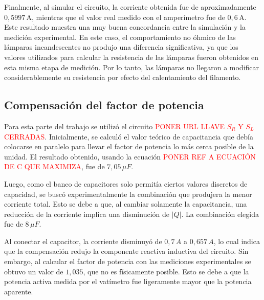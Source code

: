 Finalmente, al simular el circuito, la corriente obtenida fue de aproximadamente \(0{,}5997\,\mathrm{A}\), mientras que el valor real medido con el amperímetro fue de \(0{,}6\,\mathrm{A}\). Este resultado muestra una muy buena concordancia entre la simulación y la medición experimental. En este caso, el comportamiento no óhmico de las lámparas incandescentes no produjo una diferencia significativa, ya que los valores utilizados para calcular la resistencia de las lámparas fueron obtenidos en esta misma etapa de medición. Por lo tanto, las lámparas no llegaron a modificar considerablemente su resistencia por efecto del calentamiento del filamento.






\subsection{Compensación del factor de potencia}

Para esta parte del trabajo se utilizó el circuito \textcolor{red}{\MakeUppercase{Poner URL llave $S_R$ y $S_L$ cerradas}}. Inicialmente, se calculó el valor teórico de capacitancia que debía colocarse en paralelo para llevar el factor de potencia lo más cerca posible de la unidad. El resultado obtenido, usando la ecuación \textcolor{red}{\MakeUppercase{Poner ref a ecuación de C que maximiza}}, fue de \(7{,}05\,\mu F\).

Luego, como el banco de capacitores solo permitía ciertos valores discretos de capacidad, se buscó experimentalmente la combinación que produjera la menor corriente total. Esto se debe a que, al cambiar solamente la capacitancia, una reducción de la corriente implica una disminución de \( |Q| \). La combinación elegida fue de \(8\,\mu F\).

Al conectar el capacitor, la corriente disminuyó de \(0{,}7\,A\) a \(0{,}657\,A\), lo cual indica que la compensación redujo la componente reactiva inductiva del circuito. Sin embargo, al calcular el factor de potencia con las mediciones experimentales se obtuvo un valor de \(1{,}035\), que no es físicamente posible. Esto se debe a que la potencia activa medida por el vatímetro fue ligeramente mayor que la potencia aparente.

